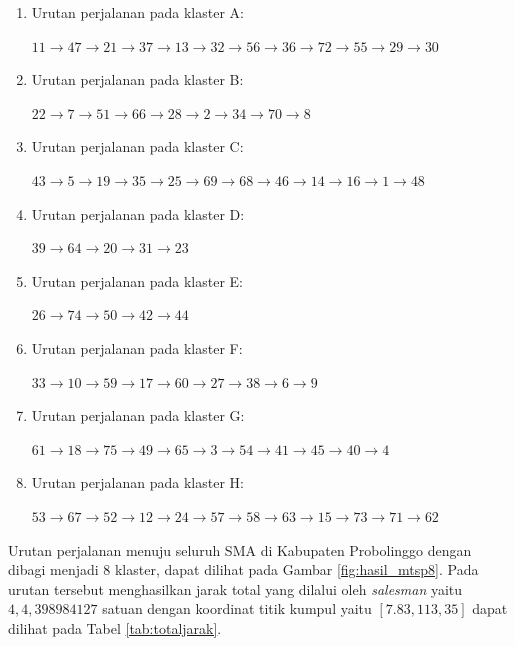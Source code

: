 \begin{enumerate}
\item Urutan perjalanan pada klaster A:

$11\rightarrow47\rightarrow21\rightarrow37\rightarrow13\rightarrow32\rightarrow56\rightarrow36\rightarrow72\rightarrow55\rightarrow29\rightarrow30$

\item Urutan perjalanan pada klaster B:

$22\rightarrow7\rightarrow51\rightarrow66\rightarrow28\rightarrow2\rightarrow34\rightarrow70\rightarrow8$

\item Urutan perjalanan pada klaster C:

$43\rightarrow5\rightarrow19\rightarrow35\rightarrow25\rightarrow69\rightarrow68\rightarrow46\rightarrow14\rightarrow16\rightarrow1\rightarrow48$

\item Urutan perjalanan pada klaster D:

$39\rightarrow64\rightarrow20\rightarrow31\rightarrow23$

\item Urutan perjalanan pada klaster E:

$26\rightarrow74\rightarrow50\rightarrow42\rightarrow44$

\item Urutan perjalanan pada klaster F:

$33\rightarrow10\rightarrow59\rightarrow17\rightarrow60\rightarrow27\rightarrow38\rightarrow6\rightarrow9$

\item Urutan perjalanan pada klaster G:

$61\rightarrow18\rightarrow75\rightarrow49\rightarrow65\rightarrow3\rightarrow54\rightarrow41\rightarrow45\rightarrow40\rightarrow4$

\item Urutan perjalanan pada klaster H:

$53\rightarrow67\rightarrow52\rightarrow12\rightarrow24\rightarrow57\rightarrow58\rightarrow63\rightarrow15\rightarrow73\rightarrow71\rightarrow62$
\end{enumerate}

Urutan perjalanan menuju seluruh SMA di Kabupaten Probolinggo dengan dibagi menjadi 8 klaster, dapat dilihat pada Gambar \ref{fig:hasil_mtsp8}. Pada urutan tersebut menghasilkan jarak total yang dilalui oleh \textit{salesman} yaitu $4,4,398984127$ satuan dengan koordinat titik kumpul yaitu $[7.83, 113,35]$ dapat dilihat pada Tabel \ref{tab:totaljarak}.

